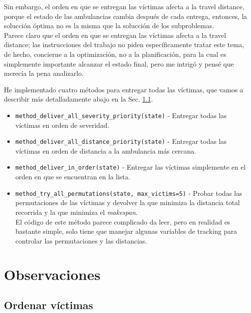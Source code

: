 Sin embargo, el orden en que se entregan las víctimas afecta a la travel distance, porque el estado de las ambulancias cambia después de cada entrega, entonces, la solucción óptima no es la misma que la solucción de los subproblemas.\\
Parece claro que el orden en que se entregan las víctimas afecta a la travel distance;
las instrucciones del trabajo no piden específicamente tratar este tema, de hecho, concierne a la optimización, no a la planificación, para la cual es simplemente importante alcanzar el estado final, pero me intrigó y pensé que merecía la pena analizarlo.

He implementado cuatro métodos para entregar todas las víctimas, que vamos a describir más detalladamente abajo en la Sec. \ref{sec:ordenar_victimas}.
\begin{itemize}
   \item \lstinline|method_deliver_all_severity_priority(state)| - Entregar todas las víctimas en orden de severidad.
   \item \lstinline|method_deliver_all_distance_priority(state)| - Entregar todas las víctimas en orden de distancia a la ambulancia más cercana.
   \item \lstinline|method_deliver_in_order(state)| - Entregar las víctimas simplemente en el orden en que se encuentran en la lista.
   \item \lstinline|method_try_all_permutations(state, max_victims=5)| - Probar todas las permutaciones de las víctimas y devolver la que minimiza la distancia total recorrida y la que minimiza el \textit{makespan}.\\
   El código de este método parece complicado da leer, pero en realidad es bastante simple, solo tiene que manejar algunas variables de tracking para controlar las permutaciones y las distancias.
\end{itemize}

\section{Observaciones}

\subsection{Ordenar víctimas}
\label{sec:ordenar_victimas}

